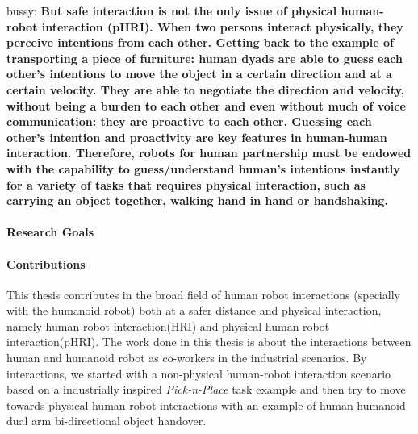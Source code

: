 \documentclass[a4paper, 11pt, oneside]{Thesis}
\begin{document}
bussy: \textbf{But safe interaction is not the only issue of physical human-robot interaction (pHRI). When two persons interact physically, they perceive intentions from each other. Getting
	back to the example of transporting a piece of furniture: human dyads are able to guess each
	other’s intentions to move the object in a certain direction and at a certain velocity. They
	are able to negotiate the direction and velocity, without being a burden to each other and
	even without much of voice communication: they are proactive to each other. Guessing each
	other’s intention and proactivity are key features in human-human interaction. Therefore,
	robots for human partnership must be endowed with the capability to guess/understand human’s intentions instantly for a variety of tasks that requires physical interaction, such as
	carrying an object together, walking hand in hand or handshaking.} 

\paragraph*{Research Goals\\}

\paragraph*{Contributions\\}

This thesis contributes in the broad field of human robot interactions (specially with the humanoid robot) both at a safer distance and physical interaction, namely human-robot interaction(HRI) and physical human robot interaction(pHRI). The work done in this thesis is about the interactions between human and humanoid robot as co-workers in the industrial scenarios. By interactions, we started with a non-physical human-robot interaction scenario based on a industrially inspired \textit{Pick-n-Place} task example and then try to move towards physical human-robot interactions with an example of human humanoid dual arm bi-directional object handover.


\end{document}
